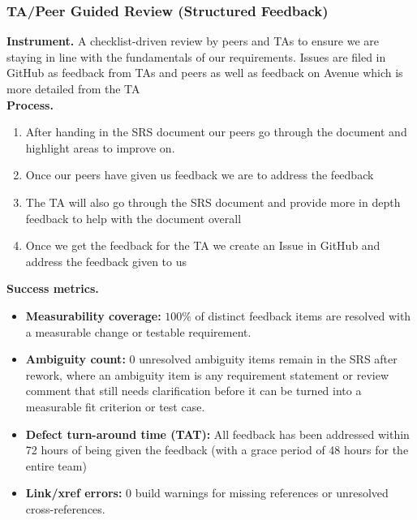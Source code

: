 \documentclass[12pt, titlepage]{article}
\begin{document}
\subsubsection*{TA/Peer Guided Review (Structured Feedback)}
\textbf{Instrument.} A checklist-driven review by peers and TAs to ensure we are staying in line with the fundamentals of our requirements. Issues are filed in GitHub as feedback from TAs and peers as well as feedback on Avenue which is more detailed from the TA\\

\noindent\textbf{Process.}
\begin{enumerate}
  \item After handing in the SRS document our peers go through the document and highlight areas to improve on.
  \item Once our peers have given us feedback we are to address the feedback
  \item The TA will also go through the SRS document and provide more in depth feedback to help with the document overall
  \item Once we get the feedback for the TA we create an Issue in GitHub and address the feedback given to us
\end{enumerate}
\textbf{Success metrics.}
\begin{itemize}
  \item \textbf{Measurability coverage:} $100\%$ of distinct feedback items are resolved with a measurable change or testable requirement.
  \item \textbf{Ambiguity count:} $0$ unresolved ambiguity items remain in the SRS after rework, where an ambiguity item is any requirement statement or review comment that still needs clarification before it can be turned into a measurable fit criterion or test case.
  \item \textbf{Defect turn-around time (TAT):} All feedback has been addressed within 72 hours of being given the feedback (with a grace period of 48 hours for the entire team)
  \item \textbf{Link/xref errors:} $0$ build warnings for missing references or unresolved cross-references.
\end{itemize}
\end{document}
